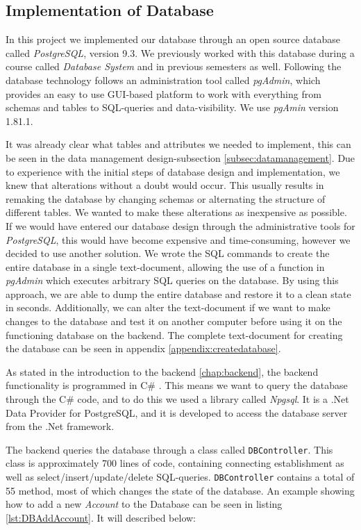 \subsection{Implementation of Database}
\label{subsec:dbImpl}
In this project we implemented our database through an open source database called \textit{PostgreSQL}\cite{postgreSQL}, version 9.3. We previously worked with this database during a course called \textit{Database System} and in previous semesters as well. Following the database technology follows an administration tool called \textit{pgAdmin}\cite{pgAdmin}, which provides an easy to use GUI-based platform to work with everything from schemas and tables to SQL-queries and data-visibility. We use \textit{pgAmin} version 1.81.1.

It was already clear what tables and attributes we needed to implement, this can be seen in the data management design-subsection \ref{subsec:datamanagement}. Due to experience with the initial steps of database design and implementation, we knew that alterations without a doubt would occur. This usually results in remaking the database by changing schemas or alternating the structure of different tables. We wanted to make these alterations as inexpensive as possible. If we would have entered our database design through the administrative tools for \textit{PostgreSQL}, this would have become expensive and time-consuming, however we decided to use another solution. We wrote the SQL commands to create the entire database in a single text-document, allowing the use of a function in \textit{pgAdmin} which executes arbitrary SQL queries on the database. By using this approach, we are able to dump the entire database and restore it to a clean state in seconds. Additionally, we can alter the text-document if we want to make changes to the database and test it on another computer before using it on the functioning database on the backend. The complete text-document for creating the database can be seen in appendix \ref{appendix:createdatabase}. 

As stated in the introduction to the backend \ref{chap:backend}, the backend functionality is programmed in C\# . This means we want to query the database through the C\# code, and to do this we used a library called \textit{Npgsql}\cite{npgsql}. It is a .Net Data Provider for PostgreSQL, and it is developed to access the database server from the .Net framework\cite{npgsql}. 

The backend queries the database through a class called \texttt{DBController}. This class is approximately 700 lines of code, containing connecting establishment as well as select/insert/update/delete SQL-queries. \texttt{DBController} contains a total of 55 method, most of which changes the state of the database. An example showing how to add a new \textit{Account} to the Database can be seen in listing \ref{lst:DBAddAccount}. It will described below:


